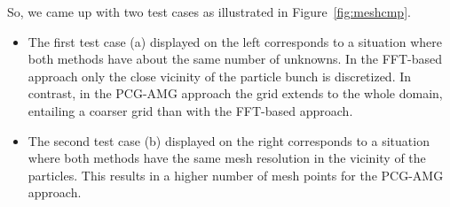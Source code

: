 So, we came up with two test cases as illustrated in
Figure~\ref{fig:meshcmp}.
\begin{itemize}
\item The first test case (a) displayed on the left corresponds to a
  situation where both methods have about the same number of unknowns.
  In the FFT-based approach only the close vicinity of the particle
  bunch is discretized.  In contrast, in the PCG-AMG approach the grid
  extends to the whole domain, entailing a coarser grid than with the
  FFT-based approach.

\item The second test case (b) displayed on the right corresponds to a
  situation where both methods have the same mesh resolution in the
  vicinity of the particles.  This results in a higher number of mesh
  points for the PCG-AMG approach.
\end{itemize}


